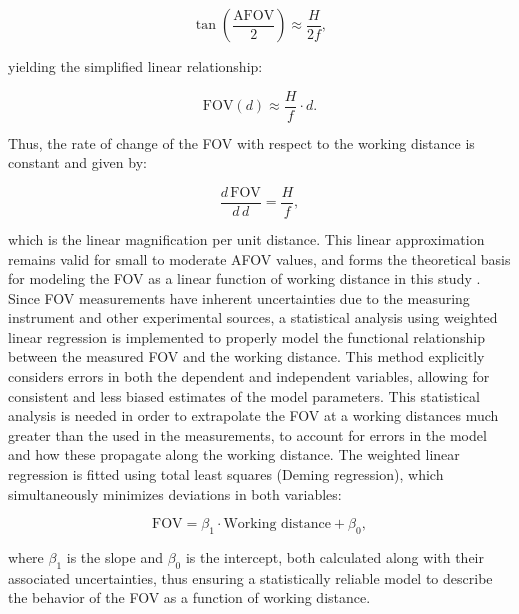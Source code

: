 \begin{equation}
\tan\left(\frac{\text{AFOV}}{2}\right) \approx \frac{H}{2f},
\end{equation}

\noindent
yielding the simplified linear relationship:

\begin{equation}
\text{FOV}(d) \approx \frac{H}{f} \cdot d.
\end{equation}

\noindent
Thus, the rate of change of the FOV with respect to the working distance is constant and given by:

\begin{equation}
\frac{d\,\text{FOV}}{d\,d} = \frac{H}{f},
\end{equation}

\noindent
which is the linear magnification per unit distance. This linear approximation remains valid for small to moderate AFOV values, and forms the theoretical basis for modeling the FOV as a linear function of working distance in this study \cite{Hecht2002Optics}.\\


\noindent Since FOV measurements have inherent uncertainties due to the measuring instrument and other experimental sources, a statistical analysis using weighted linear regression is implemented to properly model the functional relationship between the measured FOV and the working distance. This method explicitly considers errors in both the dependent and independent variables, allowing for consistent and less biased estimates of the model parameters. This statistical analysis is needed in order to extrapolate the FOV at a working distances much greater than the used in the measurements, to account for errors in the model and how these propagate along the working distance. The weighted linear regression is fitted using total least squares (Deming regression), which simultaneously minimizes deviations in both variables:

\begin{equation}
\text{FOV} = \beta_1 \cdot \text{Working distance} + \beta_0,
\label{eq:regresion_lineal}
\end{equation}

\noindent where $\beta_1$ is the slope and $\beta_0$ is the intercept, both calculated along with their associated uncertainties, thus ensuring a statistically reliable model to describe the behavior of the FOV as a function of working distance.\\

